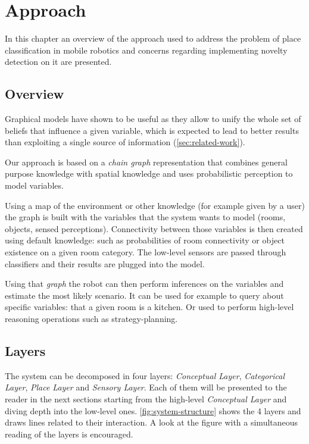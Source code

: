 \chapter{Approach}
\label{chap:approach}
In this chapter an overview of the approach used to address the problem of place classification in mobile robotics and concerns regarding implementing novelty detection on it are presented.


\section{Overview}
Graphical models have shown to be useful as they allow to unify the whole set of beliefs that influence a given variable, which is expected to lead to better results than exploiting a single source of information (\autoref{sec:related-work}).

Our approach is based on a \emph{chain graph} representation that combines general purpose knowledge with spatial knowledge and uses probabilistic perception to model variables.

Using a map of the environment or other knowledge (for example given by a user) the graph is built with the variables that the system wants to model (rooms, objects, sensed perceptions).
Connectivity between those variables is then created using default knowledge: such as probabilities of room connectivity or object existence on a given room category.
The low-level sensors are passed through classifiers and their results are plugged into the model.

Using that \emph{graph} the robot can then perform inferences on the variables and estimate the most likely scenario. 
It can be used for example to query about specific variables: that a given room is a kitchen.
Or used to perform high-level reasoning operations such as strategy-planning.


\section{Layers}
The system can be decomposed in four layers:
\emph{Conceptual Layer}, \emph{Categorical Layer}, \emph{Place Layer} and \emph{Sensory Layer}.
Each of them will be presented to the reader in the next sections starting from the high-level \emph{Conceptual Layer} and diving depth into the low-level ones.
\autoref{fig:system-structure} shows the 4 layers and draws lines related to their interaction. A look at the figure with a simultaneous reading of the layers is encouraged.

